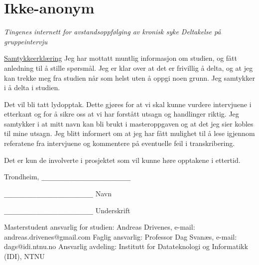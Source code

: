 \section{Ikke-anonym}
\begin{center} \textit{Tingenes internett for avstandsoppfølging av kronisk syke \newline
Deltakelse på gruppeintervju}
\end{center}
\underline{Samtykkeerklæring} \newline
Jeg har mottatt muntlig informasjon om studien, og fått anledning til å stille spørsmål. Jeg er klar over at det er frivillig
å delta, og at jeg kan trekke meg fra studien når som helst uten å oppgi noen grunn. Jeg samtykker i å delta i studien.

Det vil bli tatt lydopptak.  Dette gjøres for at vi skal kunne vurdere intervjuene i etterkant og for å sikre oss at vi har
forstått utsagn og handlinger riktig. Jeg samtykker i at mitt navn kan bli brukt i masteroppgaven og at det jeg sier kobles
til mine utsagn. Jeg blitt informert om at jeg har fått mulighet til å lese igjennom referatene fra intervjuene og
kommentere på eventuelle feil i transkribering. 

Det er kun de involverte i prosjektet som vil kunne høre opptakene i ettertid.

Trondheim, \verb|_________________________|

\verb|_________________________|\newline
Navn

\verb|_________________________|\newline
Underskrift \newline

Masterstudent ansvarlig for studien: \newline
	Andreas Drivenes, e-mail: andreas.drivenes@gmail.com \newline
Faglig ansvarlig: \newline
	Professor Dag Svanæs, e-mail: dags@idi.ntnu.no \newline
Ansvarlig avdeling: \newline
	Institutt for Datateknologi og Informatikk (IDI), NTNU
